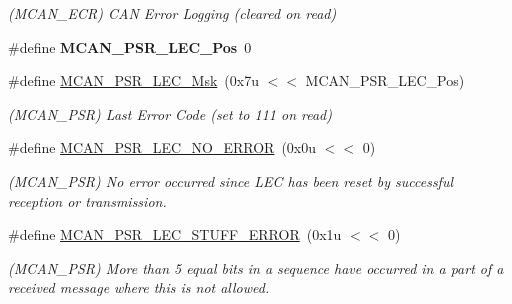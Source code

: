 \begin{DoxyCompactItemize}
\begin{DoxyCompactList}\small\item\em (M\+C\+A\+N\+\_\+\+E\+CR) C\+AN Error Logging (cleared on read) \end{DoxyCompactList}\item 
\mbox{\label{group__SAME70__MCAN_gaf690ae415b38f55f546e132ef87a0459}} 
\#define {\bfseries M\+C\+A\+N\+\_\+\+P\+S\+R\+\_\+\+L\+E\+C\+\_\+\+Pos}~0
\item 
\mbox{\label{group__SAME70__MCAN_ga7f316fbd021ba7c4cda00f5ac85b28d1}} 
\#define \mbox{\hyperlink{group__SAME70__MCAN_ga7f316fbd021ba7c4cda00f5ac85b28d1}{M\+C\+A\+N\+\_\+\+P\+S\+R\+\_\+\+L\+E\+C\+\_\+\+Msk}}~(0x7u $<$$<$ M\+C\+A\+N\+\_\+\+P\+S\+R\+\_\+\+L\+E\+C\+\_\+\+Pos)
\begin{DoxyCompactList}\small\item\em (M\+C\+A\+N\+\_\+\+P\+SR) Last Error Code (set to 111 on read) \end{DoxyCompactList}\item 
\mbox{\label{group__SAME70__MCAN_ga0b3958e9c008b0a3239832b7d16dc492}} 
\#define \mbox{\hyperlink{group__SAME70__MCAN_ga0b3958e9c008b0a3239832b7d16dc492}{M\+C\+A\+N\+\_\+\+P\+S\+R\+\_\+\+L\+E\+C\+\_\+\+N\+O\+\_\+\+E\+R\+R\+OR}}~(0x0u $<$$<$ 0)
\begin{DoxyCompactList}\small\item\em (M\+C\+A\+N\+\_\+\+P\+SR) No error occurred since L\+EC has been reset by successful reception or transmission. \end{DoxyCompactList}\item 
\mbox{\label{group__SAME70__MCAN_gac7babae866116e7ac939bd5efa3e92c1}} 
\#define \mbox{\hyperlink{group__SAME70__MCAN_gac7babae866116e7ac939bd5efa3e92c1}{M\+C\+A\+N\+\_\+\+P\+S\+R\+\_\+\+L\+E\+C\+\_\+\+S\+T\+U\+F\+F\+\_\+\+E\+R\+R\+OR}}~(0x1u $<$$<$ 0)
\begin{DoxyCompactList}\small\item\em (M\+C\+A\+N\+\_\+\+P\+SR) More than 5 equal bits in a sequence have occurred in a part of a received message where this is not allowed. \end{DoxyCompactList}\item 
\mbox{\label{group__SAME70__MCAN_ga550bbedda3c4a222985d9a35e429cbca}} 
$$
\end{DoxyCompactItemize}
